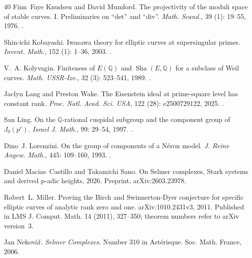\documentclass[11pt]{article}
\theoremstyle{definition}
\newcommand{\Sha}{\operatorname{Sha}}
\begin{document}
\begin{thebibliography}{40}
Finn~Faye Knudsen and David Mumford.
\newblock The projectivity of the moduli space of stable curves. {I}. {Preliminaries} on ``det'' and ``div''.
\newblock \emph{Math. Scand.}, 39 (1): 19--55, 1976.
\newblock {}.

Shin-ichi Kobayashi.
\newblock Iwasawa theory for elliptic curves at supersingular primes.
\newblock \emph{Invent. Math.}, 152 (1): 1--36, 2003.
\newblock {}.

V.~A. Kolyvagin.
\newblock Finiteness of {$E(\mathbb{Q})$} and {$\Sha(E,\mathbb{Q})$} for a subclass of {Weil} curves.
\newblock \emph{Math. USSR-Izv.}, 32 (3): 523--541, 1989.
\newblock {}.

Jaclyn Lang and Preston Wake.
\newblock The {Eisenstein} ideal at prime-square level has constant rank.
\newblock \emph{Proc. Natl. Acad. Sci. USA}, 122 (28): e2500729122, 2025.
\newblock {}.

San Ling.
\newblock On the {$\mathbb{Q}$}-rational cuspidal subgroup and the component group of {$J_0(p^r)$}.
\newblock \emph{Israel J. Math.}, 99: 29--54, 1997.
\newblock {}.

Dino~J. Lorenzini.
\newblock On the group of components of a {N\'eron} model.
\newblock \emph{J. Reine Angew. Math.}, 445: 109--160, 1993.
\newblock {}.

Daniel Macias~Castillo and Takamichi Sano.
\newblock On {Selmer} complexes, {Stark} systems and derived p-adic heights, 2026.
\newblock Preprint, arXiv:2603.23978.

Robert~L. Miller.
\newblock Proving the {Birch} and {Swinnerton-Dyer} conjecture for specific elliptic curves of analytic rank zero and one.
\newblock arXiv:1010.2431v3, 2011.
\newblock Published in LMS J. Comput. Math. 14 (2011), 327--350; theorem numbers refer to arXiv version~3.

Jan Nekov\'a\v{r}.
\newblock \emph{Selmer Complexes}.
\newblock Number 310 in Ast\'erisque. Soc. Math. France, 2006.


\end{thebibliography}
\end{document}
